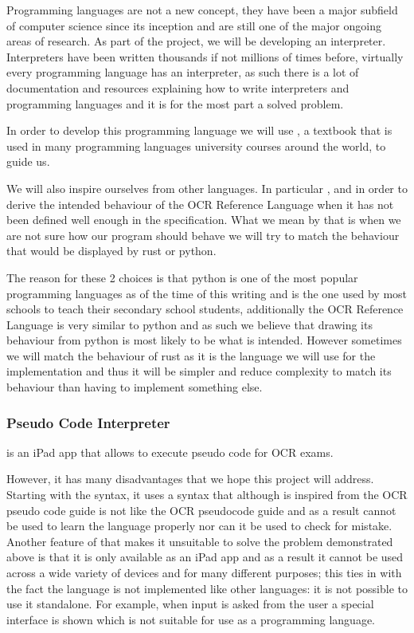 \documentclass{article}
\begin{document}
Programming languages are not a new concept, they have been a major subfield of
computer science since its inception and are still one of the major ongoing
areas of research. As part of the project, we will be developing an
interpreter. Interpreters have been written thousands if not millions of times
before, virtually every programming language has an interpreter, as such there
is a lot of documentation and resources explaining how to write interpreters
and programming languages and it is for the most part a solved problem.

In order to develop this programming language we will use \textcite{eopl}, a
textbook that is used in many programming languages university courses around
the world, to guide us.

We will also inspire ourselves from other languages. In particular
, and  in order to derive the intended
behaviour of the OCR Reference Language when it has not been defined well
enough in the specification. What we mean by that is when we are not sure how
our program should behave we will try to match the behaviour that would be
displayed by rust or python.

The reason for these 2 choices is that python is one of the most popular
programming languages as of the time of this writing and is the one used by
most schools to teach their secondary school students, additionally the OCR
Reference Language is very similar to python and as such we believe that
drawing its behaviour from python is most likely to be what is intended.
However sometimes we will match the behaviour of rust as it is the language we
will use for the implementation and thus it will be simpler and reduce
complexity to match its behaviour than having to implement something else.

\subsubsection{Pseudo Code Interpreter}

 is an iPad app that allows to execute pseudo code
for OCR exams.

However, it has many disadvantages that we hope this project will address.
Starting with the syntax, it uses a syntax that although is inspired from the
OCR pseudo code guide is not like the OCR pseudocode guide and as a result
cannot be used to learn the language properly nor can it be used to check for
mistake. Another feature of  that makes it
unsuitable to solve the problem demonstrated above is that it is only available
as an iPad app and as a result it cannot be used across a wide variety of
devices and for many different purposes; this ties in with the fact the
language is not implemented like other languages: it is not possible to use it
standalone. For example, when input is asked from the user a special interface
is shown which is not suitable for use as a programming language.
\end{document}
